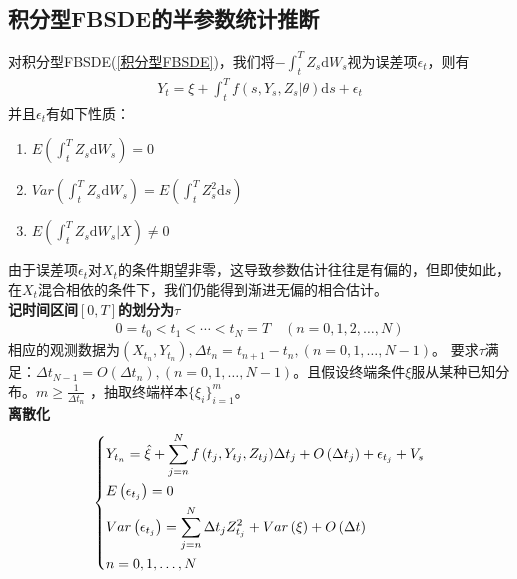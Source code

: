 	\subsection{积分型FBSDE的半参数统计推断}
		对积分型FBSDE(\ref{积分型FBSDE})，我们将$ - \int_t^T {{Z_s}\mathrm{d}{W_s}}$视为误差项$\epsilon_t$，则有
		\begin{align*}
		{{Y_t} = \xi  + \int_t^T {f\left( {s,{Y_s},{Z_s}|\theta } \right)\mathrm{d}s}  + {\epsilon _t}}\end{align*}
		并且${\epsilon _t}$有如下性质：
		\begin{enumerate}
		  \item ${E\left( {\int_t^T {{Z_s}\mathrm{d}{W_s}} } \right) = 0}$
		  \item ${Var\left( {\int_t^T {{Z_s}\mathrm{d}{W_s}} } \right) = E\left( {\int_t^T {Z_s^2\mathrm{d}s} } \right)}$
		  \item ${E\left( {\int_t^T {{Z_s}\mathrm{d}{W_s}\left| X \right.} } \right) \neq 0}$
		\end{enumerate}
		\par
		由于误差项$\epsilon_t$对$X_t$的条件期望非零，这导致参数估计往往是有偏的，但即使如此，在$X_t$混合相依的条件下，我们仍能得到渐进无偏的相合估计。\\
		\textbf{记时间区间$[0,T]$的划分为$\tau$}\\
		\begin{align*}
		0=t_0<t_1<\cdots<t_N=T \quad(n=0,1,2,\ldots,N)\end{align*}
		相应的观测数据为$(X_{t_n},Y_{t_n}),\Delta t_n=t_{n+1}-t_n,(n=0,1,\ldots,N-1)$。
		要求$\tau$满足：$\Delta t_{N-1}=O(\Delta t_n), (n=0,1,\ldots,N-1)$。且假设终端条件$\xi$服从某种已知分布。${m \geqslant \frac{1}{{\Delta {t_n}}}}$ ，抽取终端样本$\{\xi_i\}_{i=1}^m$。\\
		\textbf{离散化}\\
		\begin{equation*}
		\centering
		\left\{\begin{lgathered}
		{{Y_{{t_n}}} = \hat \xi  + \sum\limits_{j = n}^N {f\left( {{t_j},{Y_{tj}},{Z_{tj}}} \right)} \Delta {t_j} + O\left( {\Delta {t_j}} \right) + {\epsilon_{{t_j}}} + {V_s}}\\
		E\left( {{\epsilon_{{t_j}}}} \right) = 0\\
		Var\left( {{\epsilon _{{t_j}}}} \right) = \sum\limits_{j = n}^N {\Delta {t_j}Z_{{t_j}}^2}  + Var\left( \xi  \right) + O\left( {\Delta t} \right)\\
		n=0,1,\ldots,N
		\end{lgathered} \right.
		\end{equation*}
